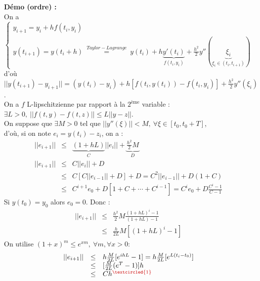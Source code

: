 \documentclass[a4paper,10pt]{report}
\begin{document}
\textbf{Démo (ordre) :}\\
\indent On a $\left\{\begin{array}{l}y_{i+1}=y_i+hf(t_i,y_i)  \\
		y(t_{i+1})=y(t_i+h)\ \overset{Taylor-Lagrange}{=}\ y(t_i)+h\underbrace{y'(t_i)}_{f(t_i,y_i)}+\frac{h^2}{2}y''(\underbrace{\xi_i}			_{\xi_i\in(t_i,t_{i+1})})\end{array} \right.$\\
\indent d'où $||y(t_{i+1})-y_{i+1}||=(y(t_i)-y_i)+h[f(t_i,y(t_i))-f(t_i,y_i)]+\frac{h^2}{2}y''(\xi_i)$.\\
\indent On a $f$ L-lipschitzienne par rapport à la $2^{\text{ème}}$ variable : $\exists L>0,\ ||f(t,y)-f(t,z)||\leq L||y-z||$.\\
\indent On suppose que $\exists M>0$ tel que $||y''(\xi)||<M,\ \forall\xi\in[t_0,t_0+T]$,\\
\indent d'où, si on note $e_i=y(t_i)-z_i$, on a :
		$$\begin{array}{lll}
		||e_{i+1}||&\leq&\underbrace{(1+hL)}_{C}||e_i||+\underbrace{\frac{h^2}{2}M}_{D}\\
		||e_{i+1}||&\leq&C||e_i||+D\\
				   &\leq&C[C||e_{i-1}||+D]+D=C^2||e_{i-1}||+D(1+C)\\
		           &\leq&C^{i+1}e_0+D[1+C+\cdots+C^{i-1}]=C^ie_0+D\frac{C^i-1}{C-1}
		\end{array}$$
\indent Si $y(t_0)=y_0$ alors $e_0=0$. Donc :
		$$\begin{array}{lll}
		||e_{i+1}||&\leq&\frac{h^2}{2}M\frac{(1+hL)^i-1}{(1+hL)-1}\\
		           &\leq&\frac{h}{2L}M[(1+hL)^i-1]
		\end{array}$$
\indent On utilise $(1+x)^m\leq e^{xm},\ \forall m,\forall x>0$:
		$$\begin{array}{lll}
		||e_{i+1}||&\leq&h\frac{M}{2L}[e^{ihL}-1]=h\frac{M}{2L}[e^{L(t_i-t_0)}]\\
		           &\leq&[\frac{M}{2L}(e^T-1)]h\\
				   &\leq&Ch^{\textcolor{red}{\textcircled{\scriptsize 1}}}
		\end{array}$$
\end{document}
